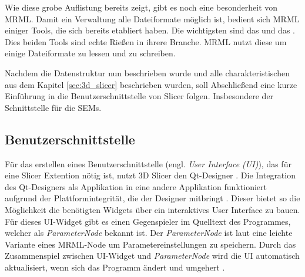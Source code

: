 Wie diese grobe Auflistung bereits zeigt, gibt es noch eine besonderheit von
MRML. Damit ein Verwaltung alle Dateiformate möglich ist, bedient sich MRML
einiger Tools, die sich bereits etabliert haben. Die wichtigsten sind das \citet{vtk2024}
und das \citet{itk2024}. Dies beiden Tools sind echte Rießen in ihrere Branche.
MRML nutzt diese um einige Dateiformate zu lessen und zu schreiben.

Nachdem die Datenstruktur nun beschrieben wurde und alle charakteristischen aus
dem Kapitel \ref{sec:3d_slicer} beschrieben wurden, soll Abschließend eine kurze
Einführung in die Benutzerschnittstelle von Slicer folgen. Insbesondere der
Schnittstelle für die SEMs.

\subsection{Benutzerschnittstelle}
\label{subsec:benutzerschnitstelle} Für das erstellen eines
Benutzerschnittstelle (engl. \textit{User Interface (UI)}), das für eine Slicer Extention
nötig ist, nutzt 3D Slicer den Qt-Designer \citep[vgl.][]{qt2024}. Die
Integration des Qt-Designers als Applikation in eine andere Applikation
funktioniert aufgrund der Plattformintegrität, die der Designer mitbringt \citep[vgl.][]{qt2024}.
Dieser bietet so die Möglichkeit die benötigten Widgets über ein interaktives User
Interface zu bauen. Für dieses UI-Widget gibt es einen Gegenspieler im Quelltext
des Programmes, welcher als \textit{ParameterNode} bekannt ist. Der \textit{ParameterNode}
ist laut \citet{slicer2024} eine leichte Variante eines MRML-Node um Parametereinstellungen
zu speichern. Durch das Zusammenspiel zwischen UI-Widget und \textit{ParameterNode}
wird die UI automatisch aktualisiert, wenn sich das Programm ändert und umgehert
\citet{slicer2024}.

